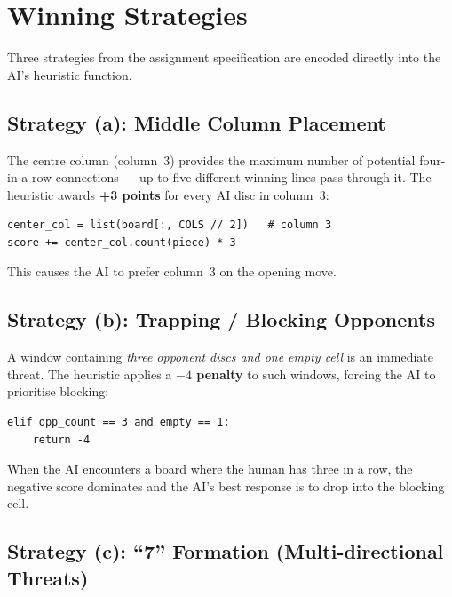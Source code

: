 \documentclass[12pt]{article}
\begin{document}
\section{Winning Strategies}

Three strategies from the assignment specification are encoded directly into
the AI's heuristic function.

\subsection{Strategy (a): Middle Column Placement}

The centre column (column~3) provides the maximum number of potential
four-in-a-row connections --- up to five different winning lines pass through
it.  The heuristic awards \textbf{+3 points} for every AI disc in column~3:

\begin{lstlisting}[caption={Centre column bonus in score\_position.}]
center_col = list(board[:, COLS // 2])   # column 3
score += center_col.count(piece) * 3
\end{lstlisting}

This causes the AI to prefer column~3 on the opening move.

\subsection{Strategy (b): Trapping / Blocking Opponents}

A window containing \emph{three opponent discs and one empty cell} is an
immediate threat.  The heuristic applies a \textbf{$-4$ penalty} to such
windows, forcing the AI to prioritise blocking:

\begin{lstlisting}[caption={Opponent threat penalty in score\_window.}]
elif opp_count == 3 and empty == 1:
    return -4
\end{lstlisting}

When the AI encounters a board where the human has three in a row, the
negative score dominates and the AI's best response is to drop into the
blocking cell.

\subsection{Strategy (c): ``7'' Formation (Multi-directional Threats)}
\end{document}
